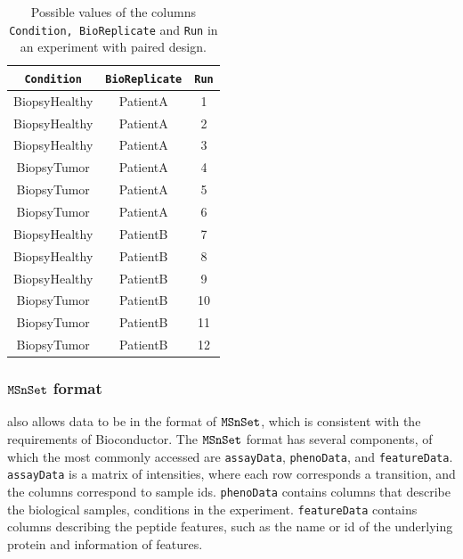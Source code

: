 \documentclass[11pt]{article}
\begin{document}
\begin{enumerate}
\begin{table}[h!]
\small
\begin{center}
\begin{tabular}{|c|c|c|}
  \hline
{\tt Condition} &   {\tt BioReplicate}&   	{\tt Run} \\ \hline \hline
BiopsyHealthy	&		PatientA	&		1\\ \hline
BiopsyHealthy	&		PatientA	&		2\\ \hline
BiopsyHealthy	&		PatientA	&		3\\ \hline
BiopsyTumor	&		PatientA	&		4\\ \hline
BiopsyTumor	&		PatientA	&		5\\ \hline
BiopsyTumor	&		PatientA	&		6\\ \hline
BiopsyHealthy	&		PatientB	&		7\\ \hline
BiopsyHealthy	&		PatientB	&		8\\ \hline
BiopsyHealthy	&		PatientB	&		9\\ \hline
BiopsyTumor	&		PatientB	&		10\\ \hline
BiopsyTumor	&		PatientB	&		11\\ \hline
BiopsyTumor	&		PatientB	&		12\\ \hline
\end{tabular}
\caption{Possible values of the columns {\tt Condition, BioReplicate} and {\tt Run} in an experiment with paired design.
\label{tab:designPaired}}
\end{center}
\end{table}

\end{enumerate}


\subsubsection{$\tt{MSnSet}$ format \label{sec:SRMmsmset}} 

\m also allows data to be in the format of $\tt{MSnSet}$, which is consistent with the requirements of Bioconductor. The $\tt{MSnSet}$ format has several components, of which the most commonly accessed are {\tt assayData}, {\tt phenoData}, and {\tt featureData}.  {\tt assayData} is a matrix of intensities, where each row corresponds a transition, and the columns correspond to sample ids. {\tt phenoData} contains columns that describe the biological samples, conditions in the experiment.  {\tt featureData} contains columns describing the peptide features, such as the name or id of the underlying protein and information of features. 
\end{document}
